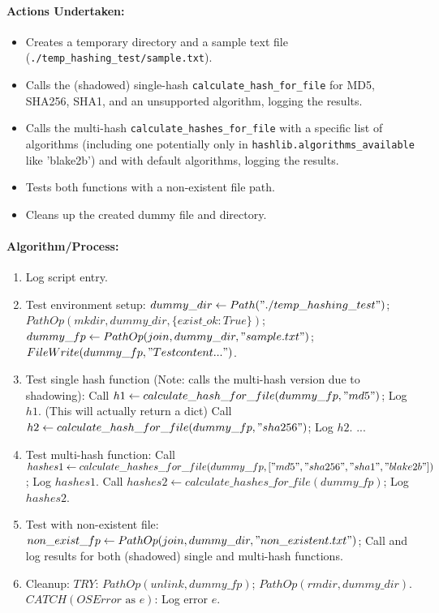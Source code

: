 \documentclass{article}
\begin{document}
\paragraph{Actions Undertaken:}
\begin{itemize}
    \item Creates a temporary directory and a sample text file (\texttt{./temp\_hashing\_test/sample.txt}).
    \item Calls the (shadowed) single-hash \texttt{calculate\_hash\_for\_file} for MD5, SHA256, SHA1, and an unsupported algorithm, logging the results.
    \item Calls the multi-hash \texttt{calculate\_hashes\_for\_file} with a specific list of algorithms (including one potentially only in \texttt{hashlib.algorithms\_available} like 'blake2b') and with default algorithms, logging the results.
    \item Tests both functions with a non-existent file path.
    \item Cleans up the created dummy file and directory.
\end{itemize}
\paragraph{Algorithm/Process:}
\begin{enumerate}
    \item Log script entry.
    \item Test environment setup: $dummy\_dir \leftarrow Path("./temp\_hashing\_test")$; $PathOp(mkdir, dummy\_dir, \{exist\_ok:True\})$; $dummy\_fp \leftarrow PathOp(join, dummy\_dir, "sample.txt")$; $FileWrite(dummy\_fp, "Test content...")$.
    \item Test single hash function (Note: calls the multi-hash version due to shadowing):
        Call $h1 \leftarrow calculate\_hash\_for\_file(dummy\_fp, "md5")$; Log $h1$. (This will actually return a dict)
        Call $h2 \leftarrow calculate\_hash\_for\_file(dummy\_fp, "sha256")$; Log $h2$.
        ...
    \item Test multi-hash function: Call $hashes1 \leftarrow calculate\_hashes\_for\_file(dummy\_fp, ["md5", "sha256", "sha1", "blake2b"])$; Log $hashes1$. Call $hashes2 \leftarrow calculate\_hashes\_for\_file(dummy\_fp)$; Log $hashes2$.
    \item Test with non-existent file: $non\_exist\_fp \leftarrow PathOp(join, dummy\_dir, "non\_existent.txt")$; Call and log results for both (shadowed) single and multi-hash functions.
    \item Cleanup: $TRY$: $PathOp(unlink, dummy\_fp)$; $PathOp(rmdir, dummy\_dir)$. $CATCH (OSError \text{ as } e)$: Log error $e$.
\end{enumerate}
\end{document}
